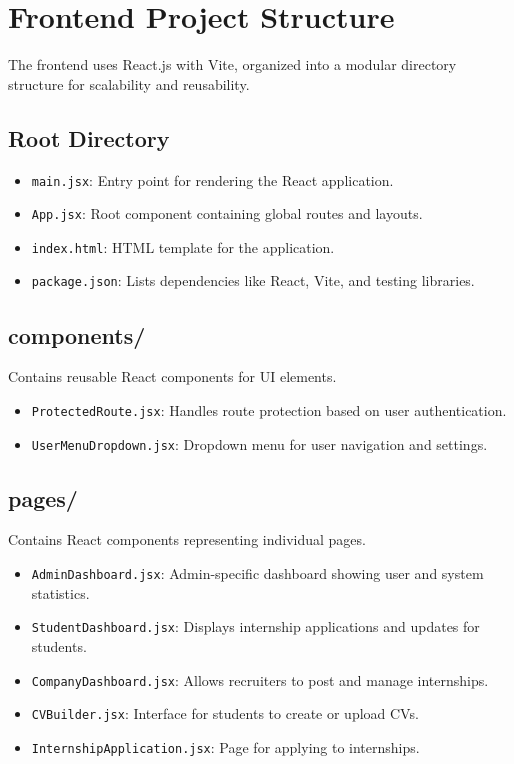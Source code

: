 \section{Frontend Project Structure}
The frontend uses React.js with Vite, organized into a modular directory structure for scalability and reusability.

\subsection{Root Directory}
\begin{itemize}
    \item \texttt{main.jsx}: Entry point for rendering the React application.
    \item \texttt{App.jsx}: Root component containing global routes and layouts.
    \item \texttt{index.html}: HTML template for the application.
    \item \texttt{package.json}: Lists dependencies like React, Vite, and testing libraries.
\end{itemize}

\subsection{components/}
Contains reusable React components for UI elements.
\begin{itemize}
    \item \texttt{ProtectedRoute.jsx}: Handles route protection based on user authentication.
    \item \texttt{UserMenuDropdown.jsx}: Dropdown menu for user navigation and settings.
\end{itemize}

\subsection{pages/}
Contains React components representing individual pages.
\begin{itemize}
    \item \texttt{AdminDashboard.jsx}: Admin-specific dashboard showing user and system statistics.
    \item \texttt{StudentDashboard.jsx}: Displays internship applications and updates for students.
    \item \texttt{CompanyDashboard.jsx}: Allows recruiters to post and manage internships.
    \item \texttt{CVBuilder.jsx}: Interface for students to create or upload CVs.
    \item \texttt{InternshipApplication.jsx}: Page for applying to internships.
\end{itemize}


